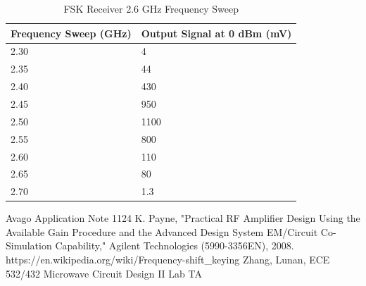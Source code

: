 \documentclass[conference]{IEEEtran}
\begin{document}
\begin{table}
\caption{FSK Receiver 2.6 GHz Frequency Sweep}
    \begin{tabular}{|l|l|}
    \hline
    Frequency Sweep (GHz) & Output Signal at 0 dBm (mV) \\ \hline
    2.30                  & 4                           \\ \hline
    2.35                  & 44                          \\ \hline
    2.40                  & 430                         \\ \hline
    2.45                  & 950                         \\ \hline
    2.50                  & 1100                        \\ \hline
    2.55                  & 800                         \\\hline
    2.60                  & 110                         \\ \hline
    2.65                  & 80                          \\\hline
    2.70                  & 1.3                         \\\hline
    \end{tabular}
\label{tab:fsk26}
\end{table}

\begin{thebibliography}{1}
Avago Application Note 1124
K. Payne, "Practical RF Amplifier Design Using the Available Gain Procedure and the Advanced Design System EM/Circuit Co-Simulation Capability," Agilent Technologies (5990-3356EN), 2008.
https://en.wikipedia.org/wiki/Frequency-shift\_keying
Zhang, Lunan, ECE 532/432 Microwave Circuit Design II Lab TA
\end{thebibliography}
\end{document}
